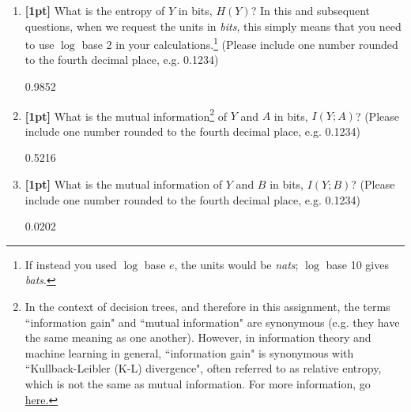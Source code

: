 \documentclass[11pt]{article}
\numberwithin{equation}{section} %
\numberwithin{figure}{section} %
\numberwithin{table}{section} %
\begin{document}
\begin{enumerate}
    \item \textbf{[1pt]} What is the entropy of $Y$ in bits, $H(Y)$? In this and subsequent questions, when we request the units in \emph{bits}, this simply means that you need to use $\log$ base 2 in your calculations.\footnote{If instead you used $\log$ base $e$, the units would be \emph{nats}; $\log$ base 10 gives \emph{bats}.}
    (Please include one number rounded to the fourth decimal place, e.g. 0.1234)
    
    \begin{tcolorbox}[fit,height=1cm, width=2cm, blank, borderline={1pt}{-2pt},nobeforeafter]
    \begin{center}\huge0.9852\end{center}
    \end{tcolorbox}
    
    
    \item \textbf{[1pt]} What is the mutual information\footnote{In the context of decision trees, and therefore in this assignment, the terms ``information gain" and ``mutual information" are synonymous (e.g. they have the same meaning as one another). However, in information theory and machine learning in general, ``information gain" is synonymous with ``Kullback-Leibler (K-L) divergence", often referred to as relative entropy, which is not the same as mutual information. For more information, go \href{https://en.wikipedia.org/wiki/Information_gain_in_decision_trees}{here.} } 
    of $Y$ and $A$ in bits, $I(Y; A)$?
    (Please include one number rounded to the fourth decimal place, e.g. 0.1234)
    
    \begin{tcolorbox}[fit,height=1cm, width=2cm, blank, borderline={1pt}{-2pt},nobeforeafter]
    \begin{center}\huge0.5216\end{center}
    \end{tcolorbox}
    

\clearpage
    \item \textbf{[1pt]} What is the mutual information of $Y$ and $B$ in bits, $I(Y; B)$?
    (Please include one number rounded to the fourth decimal place, e.g. 0.1234)
    
    \begin{tcolorbox}[fit,height=1cm, width=2cm, blank, borderline={1pt}{-2pt},nobeforeafter]
    \begin{center}\huge0.0202\end{center}
    \end{tcolorbox}
    

\end{enumerate}
\end{document}
